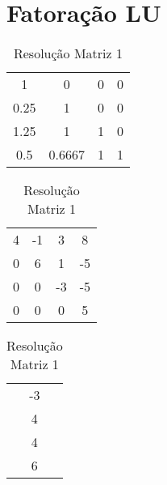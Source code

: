 \documentclass[12pt]{article}
\begin{document}
\section{Fatoração LU}


\begin{table}[htb]
  \begin{minipage}[b]{.46\linewidth}

    \centering
    \begin{tabular}{|c c c|c|}
        1           &         0          &           0     &   0\\
        0.25           &         1          &           0     &   0\\
        1.25           &         1          &           1     &   0\\
        0.5           &         0.6667          &           1     &   1\\
    \end{tabular}
    \caption{Matriz LU 1}
    \label{tab:dir}

  \end{minipage}\hfill
  \begin{minipage}[b]{.46\linewidth}

    \centering
    \begin{tabular}{|c c c|c|}
        4           &         -1          &           3     &   8\\
        0           &         6          &           1     &   -5\\
        0           &         0          &           -3     &   -5\\
        0           &         0          &           0     &   5\\
    \end{tabular}
    \caption{Matriz U 1}
    \label{tab:esq}

  \end{minipage}\hfill
  \begin{minipage}[b]{.46\linewidth}

    \centering
    \begin{tabular}{|c|}
        -3\\
        4\\
        4\\
        6\\
    \end{tabular}
    \caption{Resolução Matriz 1}
    \label{tab:dir}
  \end{minipage}
\end{table}
\end{document}
